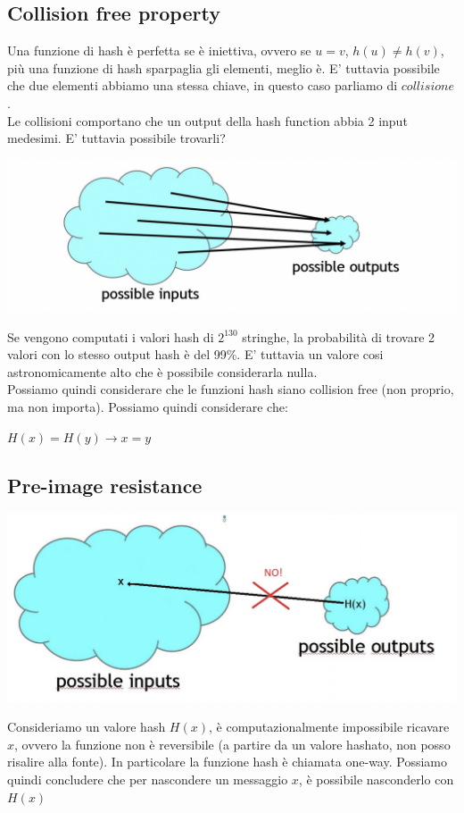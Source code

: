 \documentclass[11pt, oneside]{article}   	%
\begin{document}
\subsection*{Collision free property}
Una funzione di hash è perfetta se è iniettiva, ovvero se $u = v$, $h(u) \neq h(v)$, più una funzione di hash sparpaglia gli elementi, meglio è. E' tuttavia possibile che due elementi abbiamo una stessa chiave, in questo caso parliamo di $collisione$. \\
Le collisioni comportano che un output della hash function abbia 2 input medesimi. E' tuttavia possibile trovarli?
\begin{center}
\includegraphics[scale= 0.5]{h1}
\end{center}
Se vengono computati i valori hash di $2^{130}$ stringhe, la probabilità di trovare 2 valori con lo stesso output hash è del 99\%. E' tuttavia un valore cosi astronomicamente alto che è possibile considerarla nulla.\\
Possiamo quindi considerare che le funzioni hash siano collision free (non proprio, ma non importa). Possiamo quindi considerare che:
\begin{center}
$H(x) = H(y) \rightarrow x = y$
\end{center}

\subsection*{Pre-image resistance}
\begin{center}
\includegraphics[scale= 0.5]{h2}
\end{center}
Consideriamo un valore hash $H(x)$, è computazionalmente impossibile ricavare $x$, ovvero la funzione non è reversibile (a partire da un valore hashato, non posso risalire alla fonte). In particolare la funzione hash è chiamata one-way. Possiamo quindi concludere che per nascondere un messaggio $x$, è possibile nasconderlo con $H(x)$
\end{document}
